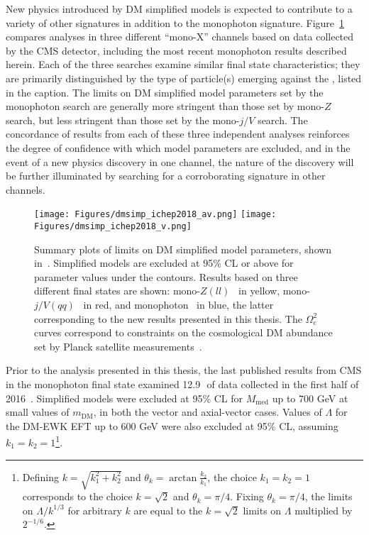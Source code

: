 New physics introduced by DM simplified models is expected to contribute to a variety of other signatures in addition to the monophoton signature. Figure~\ref{fig:dmsimp_ichep2018} compares
analyses in three different ``mono-X'' channels based on data collected by the CMS detector, including the most recent monophoton results described herein. Each of the three
searches examine similar final state characteristics; they are primarily distinguished by the type of particle(s) emerging against the \vecMET, listed in the caption.
The limits on DM simplified model parameters set by the monophoton search are generally more stringent than those set by mono-$Z$ search, but less stringent
than those set by the mono-$j/V$ search. The concordance of results from each of these three independent analyses reinforces the degree of confidence with which model
parameters are excluded, and in the event of a new physics discovery in one channel, the nature of the discovery will be further illuminated by searching for a corroborating
signature in other channels.

\begin{figure}[hbtb]
  \begin{center}
    \texttt{[image: Figures/dmsimp\_ichep2018\_av.png]}
    \texttt{[image: Figures/dmsimp\_ichep2018\_v.png]}
    \caption{Summary plots of limits on DM simplified model parameters, shown in~\cite{ref:dmsummaryplots_ichep2018}. Simplified models are excluded at 95\% CL or above
    for parameter values under the contours.
    Results based on three different final states are shown: mono-$Z(ll)$~\cite{ref:epjc/s10052-018-5740-1} in yellow, mono-$j/V(qq)$~\cite{ref:PhysRevD.97.092005} in red, and monophoton~\cite{ref:1810.00196} in blue,
    the latter corresponding to the new results presented in this thesis. The $\Omega_\mathrm{c}^{2}$ curves correspond to constraints on the cosmological DM abundance set by Planck satellite measurements~\cite{ref:planck2018_cosparams}.}
    \label{fig:dmsimp_ichep2018}
  \end{center}
\end{figure}

Prior to the analysis presented in this thesis, the last published results from CMS in the monophoton final state examined 12.9\,\fbinv\ of data collected in the first half
of 2016~\cite{ref:JHEP10(2017)073}. Simplified models were excluded at 95\% CL for $M_\mathrm{med}$ up to 700 GeV at small values of $m_\mathrm{DM}$, in both the vector
and axial-vector cases. Values of $\Lambda$ for the DM-EWK EFT up to 600 GeV were also excluded at 95\% CL, assuming $k_{1} = k_{2} = 1$\footnote{Defining $k = \sqrt{k_{1}^{2} + k_{2}^{2}}$
and $\theta_{k} = \arctan{\frac{k_{2}}{k_{1}}}$, the choice $k_{1} = k_{2} = 1$ corresponds to the choice $k = \sqrt{2}$ and $\theta_{k} = \pi/4$. Fixing $\theta_{k} = \pi/4$,
the limits on $\Lambda / k^{1/3}$ for arbitrary $k$ are equal to the $k = \sqrt{2}$ limits on $\Lambda$ multiplied by $2^{-1/6}$.}.

